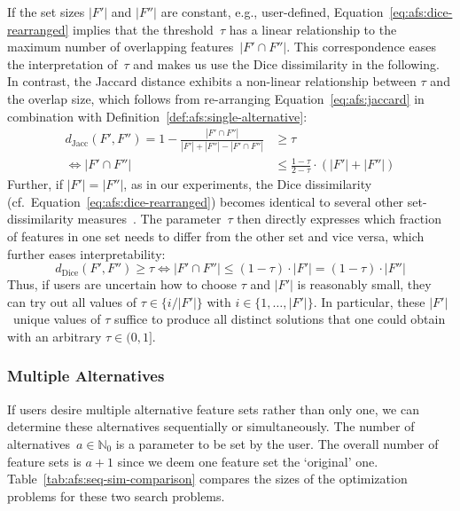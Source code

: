 \documentclass{article}
\theoremstyle{definition}
\begin{document}
If the set sizes $|F'|$ and $|F''|$ are constant, e.g., user-defined, Equation~\ref{eq:afs:dice-rearranged} implies that the threshold~$\tau$ has a linear relationship to the maximum number of overlapping features~$|F' \cap F''|$.
This correspondence eases the interpretation of~$\tau$ and makes us use the Dice dissimilarity in the following.
In contrast, the Jaccard distance exhibits a non-linear relationship between $\tau$ and the overlap size, which follows from re-arranging Equation~\ref{eq:afs:jaccard} in combination with Definition~\ref{def:afs:single-alternative}:
%
\begin{equation}
	\begin{aligned}
		d_{\text{Jacc}}(F',F'') = 1 - \frac{|F' \cap F''|}{|F'| + |F''| - |F' \cap F''|} &\geq \tau \\
		\Leftrightarrow |F' \cap F''| &\leq \frac{1 - \tau}{2 - \tau} \cdot (|F'| + |F''|)
		\end{aligned}
	\label{eq:afs:jaccard-rearranged}
\end{equation}
%
Further, if $|F'| = |F''|$, as in our experiments, the Dice dissimilarity (cf.~Equation~\ref{eq:afs:dice-rearranged}) becomes identical to several other set-dissimilarity measures~\cite{egghe2009new}.
The parameter~$\tau$ then directly expresses which fraction of features in one set needs to differ from the other set and vice versa, which further eases interpretability:
%
\begin{equation}
	d_{\text{Dice}}(F',F'') \geq \tau \Leftrightarrow |F' \cap F''| \leq (1 - \tau) \cdot |F'| = (1 - \tau) \cdot |F''|
	\label{eq:afs:dice-rearranged-equal-size}
\end{equation}
%
Thus, if users are uncertain how to choose $\tau$ and $|F'|$ is reasonably small, they can try out all values of $\tau \in \{i / |F'|\}$ with $i \in \{1, \dots, |F'|\}$.
In particular, these $|F'|$~unique values of $\tau$ suffice to produce all distinct solutions that one could obtain with an arbitrary $\tau \in (0,1]$.

\subsubsection{Multiple Alternatives}
\label{sec:afs:approach:constraints:multiple}

If users desire multiple alternative feature sets rather than only one, we can determine these alternatives sequentially or simultaneously.
The number of alternatives~$a \in \mathbb{N}_0$ is a parameter to be set by the user.
The overall number of feature sets is $a + 1$ since we deem one feature set the `original' one.
Table~\ref{tab:afs:seq-sim-comparison} compares the sizes of the optimization problems for these two search problems.
\end{document}
